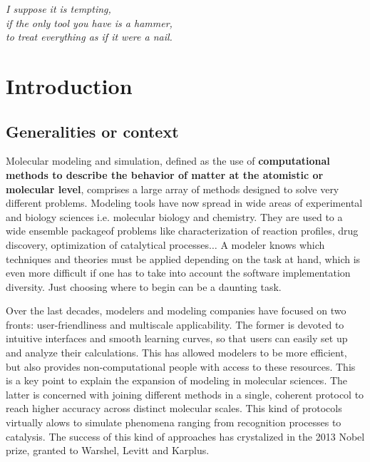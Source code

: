 
\begin{savequote}[0.6\textwidth]
	\itshape I suppose it is tempting, \\
	\itshape if the only tool you have is a hammer, \\
	\itshape to treat everything as if it were a nail.
\end{savequote}

\chapter{Introduction}
\label{chap:01}



\section{Generalities or context}
Molecular modeling and simulation, defined as the use of \textbf{computational methods to describe the behavior of matter at the atomistic or molecular level},\cite{maginn2009} comprises a large array of methods designed to solve very different problems. Modeling tools have now spread in wide areas of experimental and biology sciences i.e. molecular biology and  chemistry. They are used to a wide ensemble packageof problems like characterization of reaction profiles, drug discovery, optimization of catalytical processes$ \ldots $  A modeler knows which techniques and theories must be applied depending on the task at hand, which is even more difficult if one has to take into account the software implementation diversity. Just choosing where to begin can be a daunting task.

Over the last decades, modelers and modeling companies have focused on two fronts: user-friendliness and multiscale applicability. The former is devoted to intuitive interfaces and smooth learning curves, so that users can easily set up and analyze their calculations. This has allowed modelers to be more efficient, but also provides non-computational people with access to these resources. This is a key point to explain the expansion of modeling in molecular sciences. The latter is concerned with joining different methods in a single, coherent protocol to reach higher accuracy across distinct molecular scales. This kind of protocols virtually alows to simulate phenomena ranging from recognition processes to catalysis. The success of this kind of approaches has crystalized in the 2013 Nobel prize, granted to Warshel, Levitt and Karplus.\cite{nobel2013}

